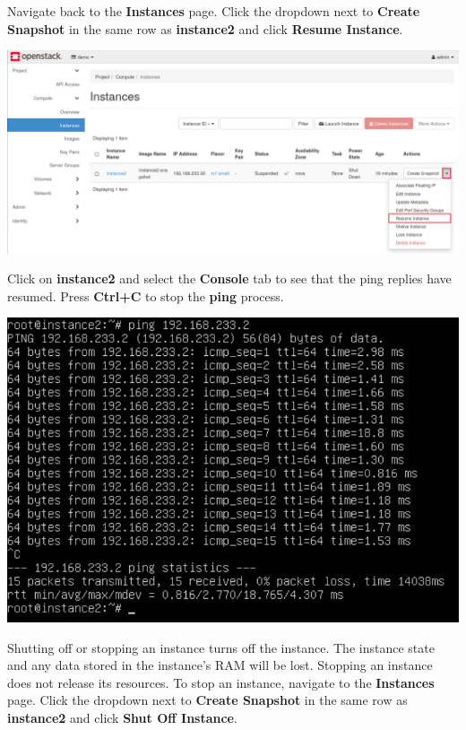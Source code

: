 \documentclass[letterpaper, 12pt]{article}
\begin{document}
\begin{enumerate}
    \begin{labstep}
        Navigate back to the \textbf{Instances} page.
        Click the dropdown next to \textbf{Create Snapshot} in the same row as \textbf{instance2} and click \textbf{Resume Instance}.

        \begin{center}
            \includegraphics[width=\linewidth]{images/part3/step10.png}
        \end{center}
    \end{labstep}

    \begin{labstep}
        Click on \textbf{instance2} and select the \textbf{Console} tab to see that the ping replies have resumed.
        Press \textbf{Ctrl+C} to stop the \textbf{ping} process.

        \begin{center}
            \includegraphics[width=\linewidth]{images/part3/step11.png}
        \end{center}
    \end{labstep}

    \begin{labstep}
        Shutting off or stopping an instance turns off the instance.
        The instance state and any data stored in the instance's RAM will be lost.
        Stopping an instance does not release its resources.
        To stop an instance, navigate to the \textbf{Instances} page.
        Click the dropdown next to \textbf{Create Snapshot} in the same row as \textbf{instance2} and click \textbf{Shut Off Instance}.


\end{labstep}
\end{enumerate}
\end{document}
